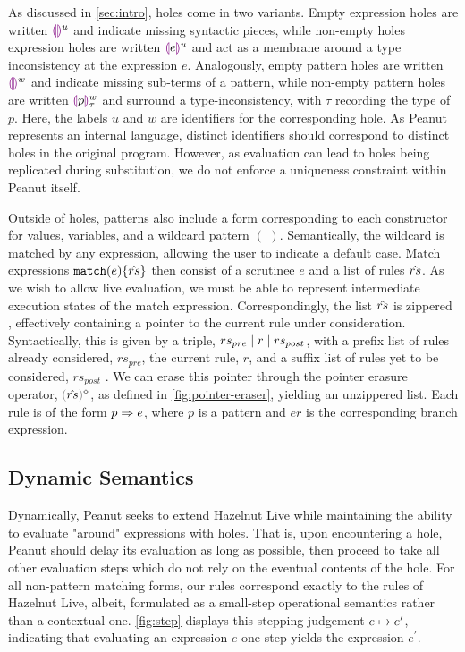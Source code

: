 As discussed in \autoref{sec:intro}, holes come in two variants. Empty expression holes are written $\textcolor{violet}{\llparenthesis}\textcolor{violet}{\rrparenthesis}^{u}$ and indicate missing syntactic pieces, while non-empty holes expression holes are written $\textcolor{violet}{\llparenthesis} e\textcolor{violet}{\rrparenthesis}^{u}$ and act as a membrane around a type inconsistency at the expression $e$. Analogously, empty pattern holes are written $\textcolor{violet}{\llparenthesis}\textcolor{violet}{\rrparenthesis}^{w}$ and indicate missing sub-terms of a pattern, while non-empty pattern holes are written $\textcolor{violet}{\llparenthesis} p\textcolor{violet}{\rrparenthesis}^{w}_{\tau}$ and surround a type-inconsistency, with $\tau$ recording the type of $p$. Here, the labels $u$ and $w$ are identifiers for the corresponding hole. As Peanut represents an internal language, distinct identifiers should correspond to distinct holes in the original program. However, as evaluation can lead to holes being replicated during substitution, we do not enforce a uniqueness constraint within Peanut itself.

Outside of holes, patterns also include a form corresponding to each constructor for values, variables, and a wildcard pattern $(\_)$. Semantically, the wildcard is matched by any expression, allowing the user to indicate a default case. Match expressions $\mathtt{match}(e) \{\hat{rs}\}$ then consist of a scrutinee $e$ and a list of rules $\hat{rs}$. As we wish to allow live evaluation, we must be able to represent intermediate execution states of the match expression. Correspondingly, the list $\hat{rs}$ is zippered \cite{DBLP:journals/jfp/Huet97}, effectively containing a pointer to the current rule under consideration. Syntactically, this is given by a triple, $rs_{pre} \mid r \mid rs_{post}$, with a prefix list of rules already considered, $rs_{pre}$, the current rule, $r$, and a suffix list of rules yet to be considered, $rs_{post}$ . We can erase this pointer through the pointer erasure operator, $\rmpointer{\zrules}$, as defined in \autoref{fig:pointer-eraser}, yielding an unzippered list. Each rule is of the form $p \Rightarrow e$, where $p$ is a pattern and $er$ is the corresponding branch expression. 

\subsection{Dynamic Semantics}\label{sec:dynamics}




Dynamically, Peanut seeks to extend Hazelnut Live \cite{DBLP:journals/pacmpl/OmarVCH19} while maintaining the ability to evaluate "around" expressions with holes. That is, upon encountering a hole, Peanut should delay its evaluation as long as possible, then proceed to take all other evaluation steps which do not rely on the eventual contents of the hole. For all non-pattern matching forms, our rules correspond exactly to the rules of Hazelnut Live, albeit, formulated as a small-step operational semantics rather than a contextual one. \autoref{fig:step} displays this stepping judgement $e \mapsto e'$, indicating that evaluating an expression $e$ one step yields the expression $e^\prime$.

